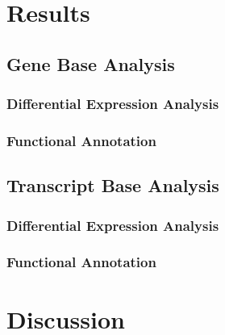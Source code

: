 \section{Results} 
\subsection{Gene Base Analysis}
\subsubsection{Differential Expression Analysis}
\subsubsection{Functional Annotation}
\subsection{Transcript Base Analysis}
\subsubsection{Differential Expression Analysis}
\subsubsection{Functional Annotation}
\section{Discussion}